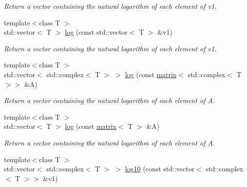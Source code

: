 \begin{DoxyCompactItemize}
\begin{DoxyCompactList}\small\item\em Return a vector containing the natural logarithm of each element of v1. \end{DoxyCompactList}\item 
\hypertarget{namespacekeycpp_a8239f43008337eeab762bc1c7414e735}{{\footnotesize template$<$class T $>$ }\\std\-::vector$<$ T $>$ \hyperlink{namespacekeycpp_a8239f43008337eeab762bc1c7414e735}{log} (const std\-::vector$<$ T $>$ \&v1)}\label{namespacekeycpp_a8239f43008337eeab762bc1c7414e735}

\begin{DoxyCompactList}\small\item\em Return a vector containing the natural logarithm of each element of v1. \end{DoxyCompactList}\item 
\hypertarget{namespacekeycpp_aba78d97ea38234b858fffc97b05e6925}{{\footnotesize template$<$class T $>$ }\\std\-::vector$<$ std\-::complex$<$ T $>$ $>$ \hyperlink{namespacekeycpp_aba78d97ea38234b858fffc97b05e6925}{log} (const \hyperlink{classkeycpp_1_1matrix}{matrix}$<$ std\-::complex$<$ T $>$$>$ \&A)}\label{namespacekeycpp_aba78d97ea38234b858fffc97b05e6925}

\begin{DoxyCompactList}\small\item\em Return a vector containing the natural logarithm of each element of A. \end{DoxyCompactList}\item 
\hypertarget{namespacekeycpp_ab1c65fb4ee4ceaf869361f4fb6fef3dd}{{\footnotesize template$<$class T $>$ }\\std\-::vector$<$ T $>$ \hyperlink{namespacekeycpp_ab1c65fb4ee4ceaf869361f4fb6fef3dd}{log} (const \hyperlink{classkeycpp_1_1matrix}{matrix}$<$ T $>$ \&A)}\label{namespacekeycpp_ab1c65fb4ee4ceaf869361f4fb6fef3dd}

\begin{DoxyCompactList}\small\item\em Return a vector containing the natural logarithm of each element of A. \end{DoxyCompactList}\item 
\hypertarget{namespacekeycpp_afb93c1aed2037f957fa113994d7239ee}{{\footnotesize template$<$class T $>$ }\\std\-::vector$<$ std\-::complex$<$ T $>$ $>$ \hyperlink{namespacekeycpp_afb93c1aed2037f957fa113994d7239ee}{log10} (const std\-::vector$<$ std\-::complex$<$ T $>$$>$ \&v1)}\label{namespacekeycpp_afb93c1aed2037f957fa113994d7239ee}


\end{DoxyCompactItemize}

